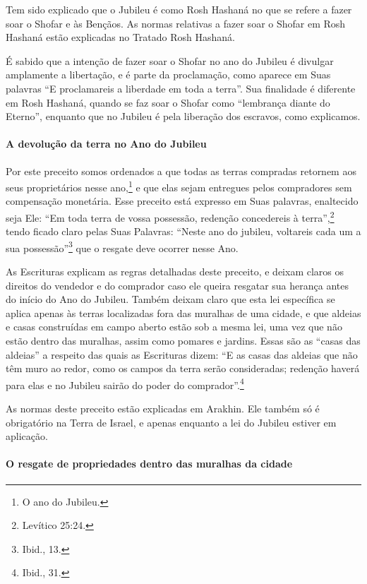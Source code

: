 Tem sido explicado que o Jubileu é como Rosh Hashaná no que se refere a
fazer soar o Shofar e às Bençãos. As normas relativas a fazer soar o
Shofar em Rosh Hashaná estão explicadas no Tratado Rosh Hashaná.

É sabido que a intenção de fazer soar o Shofar no ano do Jubileu é
divulgar amplamente a libertação, e é parte da proclamação, como aparece
em Suas palavras ``E proclamareis a liberdade em toda a terra''. Sua
finalidade é diferente em Rosh Hashaná, quando se faz soar o Shofar
como ``lembrança diante do Eterno'', enquanto que no Jubileu é pela
liberação dos escravos, como explicamos.

\paragraph{A devolução da terra no Ano do Jubileu}

Por este preceito somos ordenados a que todas as terras compradas
retornem aos seus proprietários nesse ano,\footnote{O ano do Jubileu.} e que
elas sejam entregues pelos compradores sem compensação monetária. Esse
preceito está expresso em Suas palavras, enaltecido seja Ele: ``Em toda
terra de vossa possessão, redenção concedereis à terra'',\footnote{Levítico
25:24.} tendo ficado claro pelas Suas Palavras: ``Neste ano do jubileu,
voltareis cada um a sua possessão''\footnote{Ibid., 13.} que o resgate deve
ocorrer nesse Ano.

As Escrituras explicam as regras detalhadas deste preceito, e deixam
claros os direitos do vendedor e do comprador caso ele queira resgatar
sua herança antes do início do Ano do Jubileu. Também deixam claro que
esta lei específica se aplica apenas às terras localizadas fora das
muralhas de uma cidade, e que aldeias e casas construídas em campo
aberto estão sob a mesma lei, uma vez que não estão dentro das muralhas,
assim como pomares e jardins. Essas são as ``casas das aldeias'' a
respeito das quais as Escrituras dizem: ``E as casas das aldeias que não
têm muro ao redor, como os campos da terra serão consideradas; redenção
haverá para elas e no Jubileu sairão do poder do comprador''.\footnote{Ibid., 31.}

As normas deste preceito estão explicadas em Arakhin. Ele também só é
obrigatório na Terra de Israel, e apenas enquanto a lei do Jubileu
estiver em aplicação.

\paragraph{O resgate de propriedades dentro das muralhas da cidade}


